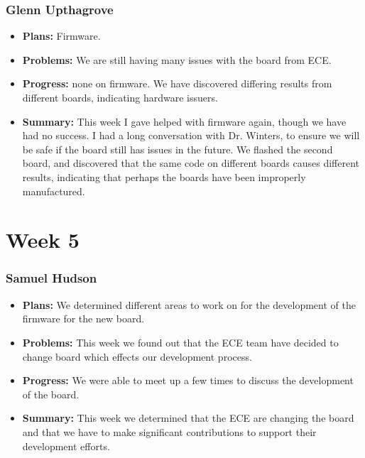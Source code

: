 \documentclass[onecolumn, draftclsnofoot,10pt, compsoc]{IEEEtran}
\begin{document}
\subsubsection{Glenn Upthagrove}
\begin {itemize}
 \item \textbf{Plans: }Firmware.
 \item \textbf{Problems: }We are still having many issues with the board from ECE.    
 \item \textbf{Progress: }none on firmware. We have discovered differing results from different boards, indicating hardware issuers.    
 \item \textbf{Summary: }This week I gave helped with firmware again, though we have had no success. I had a long conversation with Dr. Winters, to ensure we will be safe if the board still has issues in the future. We flashed the second board, and discovered that the same code on different boards causes different results, indicating that perhaps the boards have been improperly manufactured.    
\end {itemize}

\section{Week 5}
\subsubsection{Samuel Hudson}
\begin {itemize}
 \item \textbf{Plans: }We determined different areas to work on for the development of the firmware for the new board. 
 \item \textbf{Problems: }This week we found out that the ECE team have decided to change board which effects our development process. 
 \item \textbf{Progress: }We were able to meet up a few times to discuss the development of the board.
 \item \textbf{Summary: }This week we determined that the ECE are changing the board and that we have to make significant contributions to support their development efforts.
\end {itemize}
\end{document}

